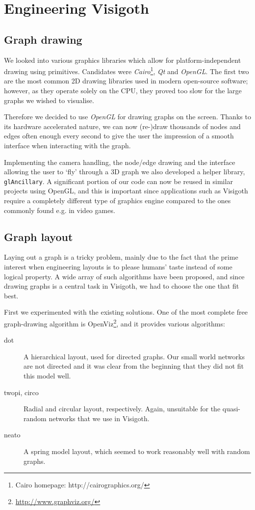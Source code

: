 \documentclass[a4paper,11pt,titlepage]{article}
\let\stdsection\section         %
\renewcommand{\section}{\newpage\stdsection}
\newcommand{\code}[1]{\texttt{#1}}
\newcommand{\buzz}[1]{\emph{#1}}
\begin{document}
\section{Engineering Visigoth}

\subsection{Graph drawing}

We looked into various graphics libraries which allow for
platform-independent drawing using primitives. Candidates were
\buzz{Cairo}\footnote{Cairo homepage: http://cairographics.org/},
\buzz{Qt} and \buzz{OpenGL}. The first two are the
most common 2D drawing libraries used in modern open-source
software; however, as they operate solely on the CPU, they proved
too slow for the large graphs we wished to visualise.

Therefore we decided to use \buzz{OpenGL} for drawing graphs on
the screen. Thanks to its hardware accelerated nature, we can now
(re-)draw thousands of nodes and edges often enough every second
to give the user the impression of a smooth interface when interacting
with the graph.

Implementing the camera handling, the node/edge drawing and the
interface allowing the user to `fly' through a 3D graph we also
developed a helper library, \code{glAncillary}. A significant portion
of our code can now be reused in similar projects using OpenGL,
and this is important since applications such as Visigoth require a
completely different type of graphics engine compared to the ones
commonly found e.g. in video games.


\subsection{Graph layout}
Laying out a graph is a tricky problem, mainly due to the fact that the
prime interest when engineering layouts is to please humans' taste
instead of some logical property. A wide array of such algorithms have
been proposed, and since drawing graphs is a central task in Visigoth,
we had to choose the one that fit best.

First we experimented with the existing solutions. One of the most
complete free graph-drawing algorithm is
OpenViz\footnote{\url{http://www.graphviz.org/}}, and it provides
various algorithms:

\begin{description}
\item [dot] A hierarchical layout, used for directed graphs. Our small
  world networks are not directed and it was clear from the beginning
  that they did not fit this model well.

\item [twopi, circo] Radial and circular layout, respectively. Again,
  unsuitable for the quasi-random networks that we use in Visigoth.

\item [neato] A spring model layout, which seemed to work reasonably
  well with random graphs.
\end{description}
\end{document}
